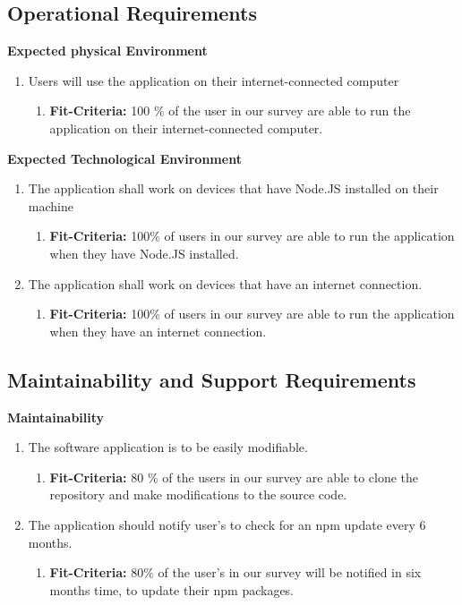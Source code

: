 \documentclass{article}
\begin{document}
\subsection{Operational Requirements}


\textbf{Expected physical Environment }
\begin{enumerate}
\item Users will use the application on their internet-connected computer 
   \begin{enumerate}
    \item \textbf{Fit-Criteria:}  100 \% of the user in our survey are able to run the application on their internet-connected computer. 
    \end{enumerate}
\end{enumerate}

\noindent
\textbf{Expected Technological Environment }
\begin{enumerate}
\item The application shall work on devices that have Node.JS installed on their machine 
   \begin{enumerate}
    \item \textbf{Fit-Criteria:}  100\% of users in our survey are able to run the application when they have Node.JS installed. 
    \end{enumerate}
\item The application shall work on devices that have an internet connection. 
   \begin{enumerate}
    \item \textbf{Fit-Criteria:}   100\% of users in our survey are able to run the application when they have an internet connection. 
    \end{enumerate}
\end{enumerate}


\subsection{Maintainability and Support Requirements}
\textbf{Maintainability} 
\begin{enumerate}
\item The software application is to be easily modifiable.
   \begin{enumerate}
    \item \textbf{Fit-Criteria:}  80 \% of the users in our survey are able to clone the repository and make modifications to the source code. 
    \end{enumerate}
\item The application should notify user's to check for an npm update every 6 months. 
   \begin{enumerate}
    \item \textbf{Fit-Criteria:}  80\% of the user's in our survey will be notified in six months time, to update their npm packages. 
    \end{enumerate}
\end{enumerate}
\end{document}
